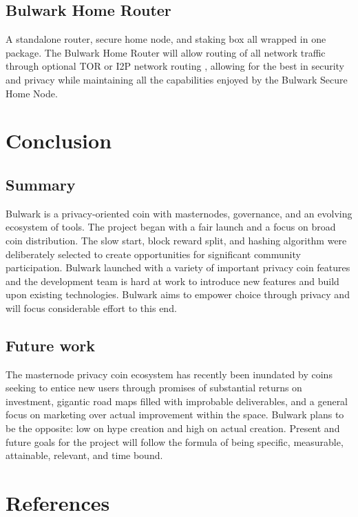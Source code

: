 \documentclass[11pt,a4paperpaper,]{report}
\begin{document}
\section{Bulwark Home Router}\label{bulwark-home-router}

A standalone router, secure home node, and staking box all wrapped in
one package. The Bulwark Home Router will allow routing of all network
traffic through optional TOR or I2P network routing , allowing for the
best in security and privacy while maintaining all the capabilities
enjoyed by the Bulwark Secure Home Node.

\chapter{Conclusion}\label{conclusion}

\section{Summary}\label{summary}

Bulwark is a privacy-oriented coin with masternodes, governance, and an
evolving ecosystem of tools. The project began with a fair launch and a
focus on broad coin distribution. The slow start, block reward split,
and hashing algorithm were deliberately selected to create opportunities
for significant community participation. Bulwark launched with a variety
of important privacy coin features and the development team is hard at
work to introduce new features and build upon existing technologies.
Bulwark aims to empower choice through privacy and will focus
considerable effort to this end.

\section{Future work}\label{future-work}

The masternode privacy coin ecosystem has recently been inundated by
coins seeking to entice new users through promises of substantial
returns on investment, gigantic road maps filled with improbable
deliverables, and a general focus on marketing over actual improvement
within the space. Bulwark plans to be the opposite: low on hype creation
and high on actual creation. Present and future goals for the project
will follow the formula of being specific, measurable, attainable,
relevant, and time bound.

\footnotesize

\chapter*{References}\label{references}
\end{document}
